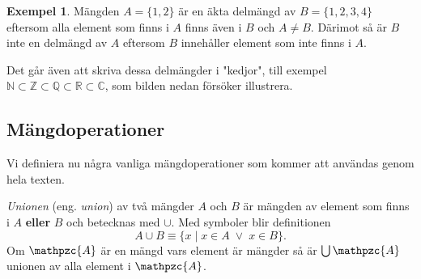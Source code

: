 \documentclass{article}
\theoremstyle{definition}
\newtheorem{exmp}[thm]{Exempel}
\begin{document}
\begin{exmp}
Mängden $A = \{1, 2\}$ är en 
äkta delmängd av $B = \{1, 2, 3, 4\}$ eftersom alla element som finns i $A$ finns även i $B$ och 
$A \neq B$. Därimot så
är $B$ inte en delmängd av $A$ eftersom $B$ innehåller element som inte finns i $A$.
\end{exmp}
 
Det går 
även att skriva dessa delmängder i "kedjor", till exempel 
$\mathbb{N} \subset \mathbb{Z} \subset \mathbb{Q} \subset \mathbb{R} \subset \mathbb{C}$, som
bilden nedan försöker illustrera. 



\begin{center}
\end{center}

\subsection{Mängdoperationer}
Vi definiera nu några vanliga mängdoperationer som kommer att användas genom hela texten. 

\begin{mydef}{}{}
  \textit{Unionen} (eng. \textit{union}) av två mängder $A$ och $B$ är mängden av element som finns i 
  $A$ \textbf{eller} $B$ och betecknas med $\cup$. Med symboler blir definitionen
  \[A \cup B \equiv \{x \; | \; x \in A \; \lor \; x \in B  \}.\]
  Om $\mathpzc{A}$ är en mängd vars element är mängder så är $\bigcup \mathpzc{A}$ unionen
  av alla element i $\mathpzc{A}$. 
\end{mydef}
\end{document}
